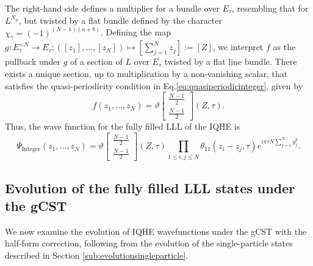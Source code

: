 \documentclass[a4paper,11pt]{article}
\begin{document}
The right-hand side defines a multiplier for a bundle over $E_{\tau}$, resembling that for $L^{N_{\phi}}$, but twisted by a flat bundle defined by the character $\chi_{\gamma} = (-1)^{(N-1)(a+b)}$. Defining the map $g: E_{\tau}^{\times N}\rightarrow E_{\tau}; ([z_{1}],...,[z_{N}])\mapsto \left[\sum_{j=1}^{N}z_{j}\right]:=[Z]$, we interpret $f$ as the pullback under $g$ of a section of $L$ over $E_{\tau}$ twisted by a flat line bundle. There exists a unique section, up to multiplication by a non-vanishing scalar, that satisfies the quasi-periodicity condition in Eq.\eqref{eq:quasiperiodicinteger}, given by
\begin{equation*}
    f(z_{1},\dots ,z_{N}) = \vartheta\begin{bmatrix}
\frac{N-1}{2}\\
\frac{N-1}{2}
\end{bmatrix}(Z,\tau). 
\end{equation*}
Thus, the wave function for the fully filled LLL of the IQHE is
\begin{equation}
    \Psi_{\mathrm{Integer}}(z_{1},...,z_{N}) = \vartheta\begin{bmatrix}
\frac{N-1}{2}\\
\frac{N-1}{2}
\end{bmatrix}(Z,\tau)\prod_{1\leq i,j\leq N}\theta_{11}(z_{i}-z_{j},\tau)e^{i\pi \tau N \sum_{j=1}^{N}y^2_j}. 
\label{eq:integerwavefunction}
\end{equation}

\subsection{Evolution of the fully filled LLL states under the   gCST}
\label{subsec:evolutionintegerquantumhalleffect}

 We now examine the evolution of IQHE wavefunctions under the gCST with the half-form correction, following from the evolution of the single-particle states described in Section \ref{sub:evolutionsingleparticle}. 
 
\end{document}
